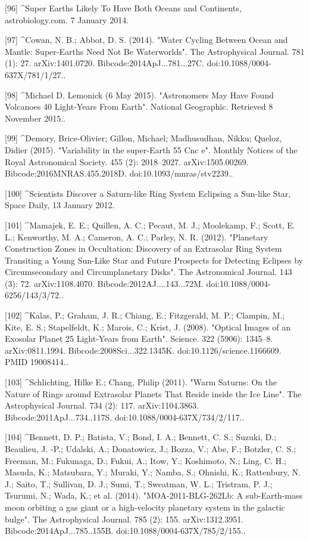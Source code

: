 [96]
^Super Earths Likely To Have Both Oceans and Continents, astrobiology.com. 7 January 2014.

[97]
^Cowan, N. B.; Abbot, D. S. (2014). "Water Cycling Between Ocean and Mantle: Super-Earths Need Not Be Waterworlds". The Astrophysical Journal. 781 (1): 27. arXiv:1401.0720. Bibcode:2014ApJ...781...27C. doi:10.1088/0004-637X/781/1/27..

[98]
^Michael D. Lemonick (6 May 2015). "Astronomers May Have Found Volcanoes 40 Light-Years From Earth". National Geographic. Retrieved 8 November 2015..

[99]
^Demory, Brice-Olivier; Gillon, Michael; Madhusudhan, Nikku; Queloz, Didier (2015). "Variability in the super-Earth 55 Cnc e". Monthly Notices of the Royal Astronomical Society. 455 (2): 2018–2027. arXiv:1505.00269. Bibcode:2016MNRAS.455.2018D. doi:10.1093/mnras/stv2239..

[100]
^Scientists Discover a Saturn-like Ring System Eclipsing a Sun-like Star, Space Daily, 13 January 2012.

[101]
^Mamajek, E. E.; Quillen, A. C.; Pecaut, M. J.; Moolekamp, F.; Scott, E. L.; Kenworthy, M. A.; Cameron, A. C.; Parley, N. R. (2012). "Planetary Construction Zones in Occultation: Discovery of an Extrasolar Ring System Transiting a Young Sun-Like Star and Future Prospects for Detecting Eclipses by Circumsecondary and Circumplanetary Disks". The Astronomical Journal. 143 (3): 72. arXiv:1108.4070. Bibcode:2012AJ....143...72M. doi:10.1088/0004-6256/143/3/72..

[102]
^Kalas, P.; Graham, J. R.; Chiang, E.; Fitzgerald, M. P.; Clampin, M.; Kite, E. S.; Stapelfeldt, K.; Marois, C.; Krist, J. (2008). "Optical Images of an Exosolar Planet 25 Light-Years from Earth". Science. 322 (5906): 1345–8. arXiv:0811.1994. Bibcode:2008Sci...322.1345K. doi:10.1126/science.1166609. PMID 19008414..

[103]
^Schlichting, Hilke E.; Chang, Philip (2011). "Warm Saturns: On the Nature of Rings around Extrasolar Planets That Reside inside the Ice Line". The Astrophysical Journal. 734 (2): 117. arXiv:1104.3863. Bibcode:2011ApJ...734..117S. doi:10.1088/0004-637X/734/2/117..

[104]
^Bennett, D. P.; Batista, V.; Bond, I. A.; Bennett, C. S.; Suzuki, D.; Beaulieu, J. -P.; Udalski, A.; Donatowicz, J.; Bozza, V.; Abe, F.; Botzler, C. S.; Freeman, M.; Fukunaga, D.; Fukui, A.; Itow, Y.; Koshimoto, N.; Ling, C. H.; Masuda, K.; Matsubara, Y.; Muraki, Y.; Namba, S.; Ohnishi, K.; Rattenbury, N. J.; Saito, T.; Sullivan, D. J.; Sumi, T.; Sweatman, W. L.; Tristram, P. J.; Tsurumi, N.; Wada, K.; et al. (2014). "MOA-2011-BLG-262Lb: A sub-Earth-mass moon orbiting a gas giant or a high-velocity planetary system in the galactic bulge". The Astrophysical Journal. 785 (2): 155. arXiv:1312.3951. Bibcode:2014ApJ...785..155B. doi:10.1088/0004-637X/785/2/155..

